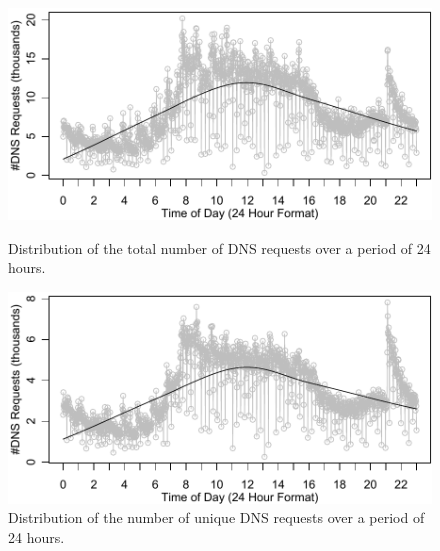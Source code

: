 \documentclass[letterpaper,twocolumn]{article}
\begin{document}
\begin{figure}[t]
\centering 
\includegraphics[width=\linewidth]{img/total_dns_over_time}
  \vspace{-15pt}
\caption{Distribution of the total number of DNS requests over a period of 24 hours.}
 \label{fig:total_dns_hit}
  \endminipage
  \hfill
\includegraphics[width=\linewidth]{img/unique_dns_over_time}
  \vspace{-15pt}
\caption{Distribution of the number of unique DNS requests over a period of 24 hours.}
 \label{fig:unique_dns_hit}
  \endminipage
  \vspace{-10pt}
 \end{figure}
 
\end{document}
